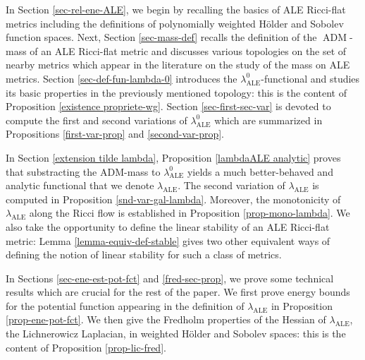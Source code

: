 \documentclass[a4paper,11pt,reqno]{amsart}
\numberwithin{equation}{section}
\begin{document}
	In Section \ref{sec-rel-ene-ALE}, we begin by recalling the basics of ALE Ricci-flat metrics including the definitions of polynomially weighted H\"older and Sobolev function spaces. Next, Section \ref{sec-mass-def} recalls the definition of the $\operatorname{ADM}$-mass of an ALE Ricci-flat metric and discusses various topologies on the set of nearby metrics which appear in the literature on the study of the mass on ALE metrics. Section \ref{sec-def-fun-lambda-0} introduces the $\lambda_{\operatorname{ALE}}^0$-functional and studies its basic properties in the previously mentioned topology: this is the content of Proposition \ref{existence propriete-wg}. Section \ref{sec-first-sec-var} is devoted to compute the first and second variations of $\lambda_{\operatorname{ALE}}^0$ which are summarized in Propositions \ref{first-var-prop} and  \ref{second-var-prop}. 
		
	In Section \ref{extension tilde lambda}, Proposition \ref{lambdaALE analytic} proves that substracting the ADM-mass to $\lambda_{\operatorname{ALE}}^0$ yields a much better-behaved and analytic functional that we denote $\lambda_{\operatorname{ALE}}$. The second variation of $\lambda_{\operatorname{ALE}}$ is computed in Proposition \ref{snd-var-gal-lambda}.  Moreover, the monotonicity of $\lambda_{\operatorname{ALE}}$ along the Ricci flow is established in Proposition \ref{prop-mono-lambda}. We also take the opportunity to define the linear stability of an ALE Ricci-flat metric: Lemma \ref{lemma-equiv-def-stable} gives two other  equivalent ways of defining the notion of linear stability for such a class of metrics.

	
	In Sections \ref{sec-ene-est-pot-fct} and \ref{fred-sec-prop}, we prove some technical results which are crucial for the rest of the paper. We first prove energy bounds for the potential function appearing in the definition of $\lambda_{\operatorname{ALE}}$ in Proposition \ref{prop-ene-pot-fct}. We then give the Fredholm properties of the Hessian of $\lambda_{\operatorname{ALE}}$, the Lichnerowicz Laplacian, in weighted H\"older and Sobolev spaces: this is the content of Proposition \ref{prop-lic-fred}.
	
\end{document}
